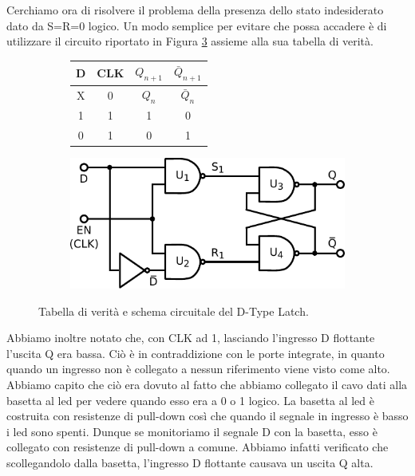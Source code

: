 Cerchiamo ora di risolvere il problema della presenza dello stato indesiderato dato da S=R=0 logico.
Un modo semplice per evitare che possa accadere è di utilizzare il circuito riportato in Figura \ref{cir11:D-type-latch} assieme alla sua tabella di verità.

\begin{figure}[htpc]
\centering
	\begin{subfigure}[hc]{.4\textwidth}
		\centering
		{\renewcommand{\arraystretch}{1.2}%
		\begin{tabular}{|c|c|c|c|}
		\hline
		D & CLK	& $Q_{n+1}$	& $\bar Q_{n+1}$  \\
		\hline
		X & 0   & $Q_n$		& $\bar Q_n$\\
		\hline
		1 & 1   & 1		& 0\\
		\hline
		0 & 1   & 0		& 1\\
		\hline
		\end{tabular}}
		\caption{}
		\label{tab11:Latch_D}
        \end{subfigure}
        \begin{subfigure}[hc]{.4\textwidth}
		\centering
		\includegraphics[width=.7\textwidth]{../E11/latex/D-type-latch.pdf}
		\caption{}
		\label{cir11:D-type-latch}
        \end{subfigure}
\caption{Tabella di verità e schema circuitale del D-Type Latch.}
\end{figure}

Abbiamo inoltre notato che, con CLK ad 1, lasciando l'ingresso D flottante l'uscita Q era bassa.
Ciò è in contraddizione con le porte integrate, in quanto quando un ingresso non è collegato a nessun riferimento viene visto come alto.
Abbiamo capito che ciò era dovuto al fatto che abbiamo collegato il cavo dati alla basetta al led per vedere quando esso era a 0 o 1 logico.
La basetta al led è costruita con resistenze di pull-down così che quando il segnale in ingresso è basso i led sono spenti.
Dunque se monitoriamo il segnale D con la basetta, esso è collegato con resistenze di pull-down a comune.
Abbiamo infatti verificato che scollegandolo dalla basetta, l'ingresso D flottante causava un uscita Q alta.

